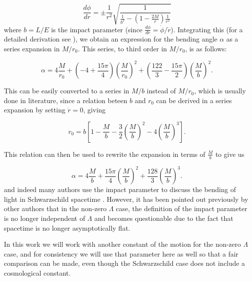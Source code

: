 \begin{equation}
  \frac{d\phi}{dr} = \pm \frac{1}{r^2} \sqrt{\frac{1}{ \frac{1}{b^2} - \left (1- \frac{2M}{r} \right )\frac{1}{r^2} }}
  \label{eq:dphi-dr}
\end{equation}
where $b = L/E$ is the impact parameter (since $\frac{d\phi}{dr} = \dot{\phi}/\dot{r}$). Integrating this (for a detailed derivation see \cite{keeton2005formalism}), we obtain an expression for the bending angle $\alpha$ as a series expansion in $M/r_0$. This series, to third order in $M/r_0$, is as follows:

\begin{equation}
  \alpha = 4 \frac{M}{r_0} + \left ( -4 + \frac{15\pi}{4} \right )\left ( \frac{M}{r_0}\right )^2 + \left ( \frac{122}{3} - \frac{15\pi}{2} \right )\left ( \frac{M}{b}\right )^2.
  \label{eq:lensing-series-expansion-r0}
\end{equation}

This can be easily converted to a series in $M/b$ instead of $M/r_0$, which is usually done in literature, since a relation beteen $b$ and $r_0$ can be derived in a series expansion by setting $\dot{r} = 0$, giving \citep{keeton2005formalism}

\begin{equation}
  r_0 = b \left [ 1 - \frac{M}{b} - \frac{3}{2} \left ( \frac{M}{b}\right)^2 - 4\left ( \frac{M}{b}\right)^3 \right ].
  \label{eq:b-r0-relation}
\end{equation} 

This relation can then be used to rewrite the expansion in terms of $\frac{M}{b}$ to give us

\begin{equation}
  \alpha = 4 \frac{M}{b} + \frac{15\pi}{4} \left ( \frac{M}{b} \right )^2 + \frac{128}{3} \left ( \frac{M}{b} \right )^3.
  \label{eq:series-expansion-b}
\end{equation}
and indeed many authors use the impact parameter to discuss the bending of light in Schwarzschild spacetime \citep{wald2010general,misner2017gravitation,butcher2016no}. However, it has been pointed out previously by other authors \citep{ishak2008new,hammad2013note,lebedev2013influence} that in the non-zero $\Lambda$ case, the definition of the impact parameter is no longer independent of $\Lambda$ and becomes questionable due to the fact that spacetime is no longer asymptotically flat. 

In this work we will work with another constant of the motion for the non-zero $\Lambda$ case, and for consistency we will use that parameter here as well so that a fair comparison can be made, even though the Schwarzschild case does not include a cosmological constant.

